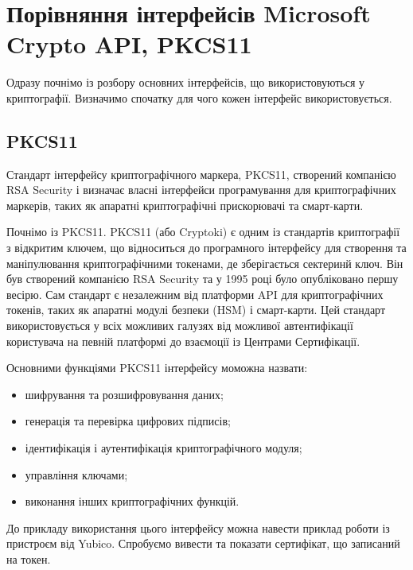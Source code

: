 \chapter{Порівняння інтерфейсів Microsoft Crypto API, PKCS11}
\label{chap:theory}

Одразу почнімо із розбору основних інтерфейсів, що використовуються у криптографії. Визначимо спочатку для чого кожен інтерфейс використовується.

\section{PKCS11}


Стандарт інтерфейсу криптографічного маркера, PKCS11, створений компанією RSA Security і визначає власні інтерфейси програмування для криптографічних маркерів, таких як апаратні криптографічні прискорювачі та смарт-карти.

Почнімо із PKCS11. PKCS11 (або Cryptoki) є одним із стандартів криптографії з відкритим ключем, що відноситься до програмного інтерфейсу для створення та маніпулювання криптографічними токенами, де зберігається сектеринй ключ. Він був створений компанією RSA Security та у 1995 році було опубліковано першу весірю. Сам стандарт є незалежним від платформи API для криптографічних токенів, таких як апаратні модулі безпеки (HSM) і смарт-карти. Цей стандарт використовується у всіх можливих галузях від можливої автентифікації користувача на певній платформі до взаємоції із Центрами Сертифікації.

Основними функціями PKCS11 інтерфейсу моможна назвати:
    \begin{itemize}
        \item шифрування та розшифровування даних;
        \item генерація та перевірка цифрових підписів;
        \item ідентифікація і аутентифікація криптографічного модуля;
        \item управління ключами;
        \item виконання інших криптографічних функцій.
    \end{itemize}

До прикладу використання цього інтерфейсу можна навести приклад роботи із пристроєм від Yubico. Спробуємо вивести та показати сертифікат, що записаний на токен.

